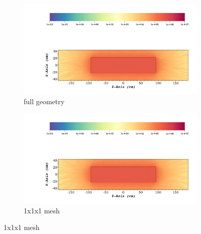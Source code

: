 \begin{figure}
	\begin{subfigure}[t]{0.5\textwidth}
		\includegraphics[width=\linewidth, trim={5cm 1cm 2cm 16cm},clip]{../figs/toy_p1/dose_VPI_original.png}
		\caption{full geometry}
		\label{fig:1dose_orig}
	\end{subfigure}\hfill
	\begin{subfigure}[t]{0.5\textwidth}
		\includegraphics[width=\linewidth, trim={5cm 1cm 2cm 16cm},clip]{../figs/toy_p1/dose_VPI_1x_mesh.png}
		\caption{1x1x1 mesh}
		\label{fig:1dose_1x_mesh}
	\end{subfigure}


\end{figure}
